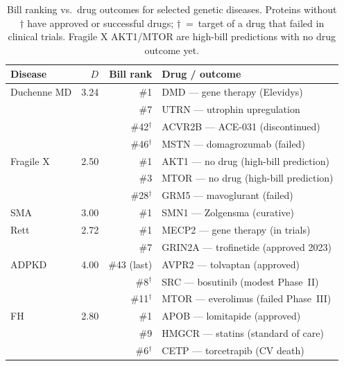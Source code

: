 \documentclass[11pt,a4paper]{article}
\begin{document}
\begin{table}[h]
\centering
\caption{Bill ranking vs.\ drug outcomes for selected genetic diseases. Proteins without $\dagger$ have approved or successful drugs; $\dagger$~=~target of a drug that failed in clinical trials. Fragile X AKT1/MTOR are high-bill predictions with no drug outcome yet.}
\label{tab:genetic_bill}
\begin{tabular}{l r r l}
\toprule
\textbf{Disease} & \textbf{$D$} & \textbf{Bill rank} & \textbf{Drug / outcome} \\
\midrule
Duchenne MD & 3.24 & \#1 & DMD --- gene therapy (Elevidys) \\
 & & \#7 & UTRN --- utrophin upregulation \\
 & & \#42$^\dagger$ & ACVR2B --- ACE-031 (discontinued) \\
 & & \#46$^\dagger$ & MSTN --- domagrozumab (failed) \\
\midrule
Fragile X & 2.50 & \#1 & AKT1 --- no drug (high-bill prediction) \\
 & & \#3 & MTOR --- no drug (high-bill prediction) \\
 & & \#28$^\dagger$ & GRM5 --- mavoglurant (failed) \\
\midrule
SMA & 3.00 & \#1 & SMN1 --- Zolgensma (curative) \\
Rett & 2.72 & \#1 & MECP2 --- gene therapy (in trials) \\
 & & \#7 & GRIN2A --- trofinetide (approved 2023) \\
\midrule
ADPKD & 4.00 & \#43 (last) & AVPR2 --- tolvaptan (approved) \\
 & & \#8$^\dagger$ & SRC --- bosutinib (modest Phase~II) \\
 & & \#11$^\dagger$ & MTOR --- everolimus (failed Phase~III) \\
\midrule
FH & 2.80 & \#1 & APOB --- lomitapide (approved) \\
 & & \#9 & HMGCR --- statins (standard of care) \\
 & & \#6$^\dagger$ & CETP --- torcetrapib (CV death) \\
\bottomrule
\end{tabular}
\end{table}
\end{document}
